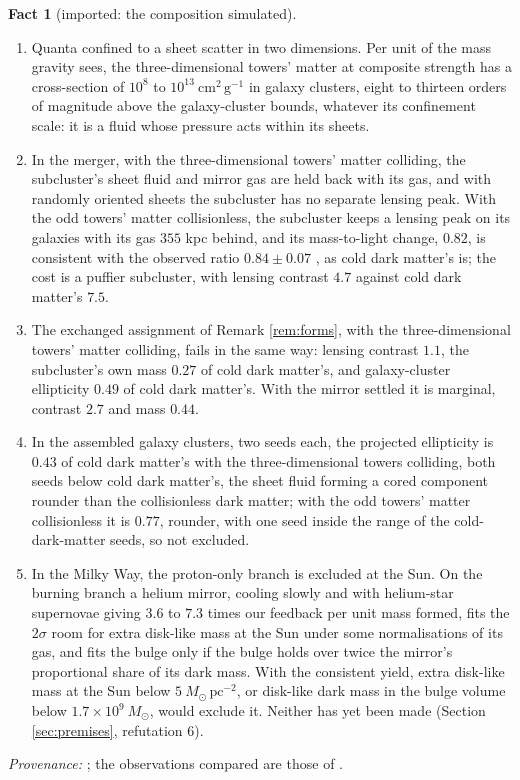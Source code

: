 \documentclass[11pt]{article}
\theoremstyle{definition}
\newtheorem{fact}[theorem]{Fact}
\begin{document}
\begin{fact}[imported: the composition simulated]\label{fact:simulated}
\begin{enumerate}
\item[(i)] Quanta confined to a sheet scatter in two dimensions. Per unit of the mass gravity sees, the three-dimensional towers' matter at composite strength has a cross-section of $10^{8}$ to $10^{13}\ \mathrm{cm^{2}\,g^{-1}}$ in galaxy clusters, eight to thirteen orders of magnitude above the galaxy-cluster bounds, whatever its confinement scale: it is a fluid whose pressure acts within its sheets.
\item[(ii)] In the merger, with the three-dimensional towers' matter colliding, the subcluster's sheet fluid and mirror gas are held back with its gas, and with randomly oriented sheets the subcluster has no separate lensing peak. With the odd towers' matter collisionless, the subcluster keeps a lensing peak on its galaxies with its gas $355$ kpc behind, and its mass-to-light change, $0.82$, is consistent with the observed ratio $0.84 \pm 0.07$ \cite{Randall2008}, as cold dark matter's is; the cost is a puffier subcluster, with lensing contrast $4.7$ against cold dark matter's $7.5$.
\item[(ii$'$)] The exchanged assignment of Remark \ref{rem:forms}, with the three-dimensional towers' matter colliding, fails in the same way: lensing contrast $1.1$, the subcluster's own mass $0.27$ of cold dark matter's, and galaxy-cluster ellipticity $0.49$ of cold dark matter's. With the mirror settled it is marginal, contrast $2.7$ and mass $0.44$.
\item[(iii)] In the assembled galaxy clusters, two seeds each, the projected ellipticity is $0.43$ of cold dark matter's with the three-dimensional towers colliding, both seeds below cold dark matter's, the sheet fluid forming a cored component rounder than the collisionless dark matter; with the odd towers' matter collisionless it is $0.77$, rounder, with one seed inside the range of the cold-dark-matter seeds, so not excluded.
\item[(iv)] In the Milky Way, the proton-only branch is excluded at the Sun. On the burning branch a helium mirror, cooling slowly and with helium-star supernovae giving $3.6$ to $7.3$ times our feedback per unit mass formed, fits the $2\sigma$ room for extra disk-like mass at the Sun under some normalisations of its gas, and fits the bulge only if the bulge holds over twice the mirror's proportional share of its dark mass. With the consistent yield, extra disk-like mass at the Sun below $5\ M_{\odot}\,\mathrm{pc^{-2}}$, or disk-like dark mass in the bulge volume below $1.7 \times 10^{9}\ M_{\odot}$, would exclude it. Neither has yet been made (Section \ref{sec:premises}, refutation 6).
\end{enumerate}
\emph{Provenance:} \cite[Prop.~3.1, Cor.~3.4, Obs.~7.1, 7.2, 9.1, Tables~3, 4]{ButlerT14b}; the observations compared are those of \cite{Clowe2006, Randall2008}.
\end{fact}
\end{document}
